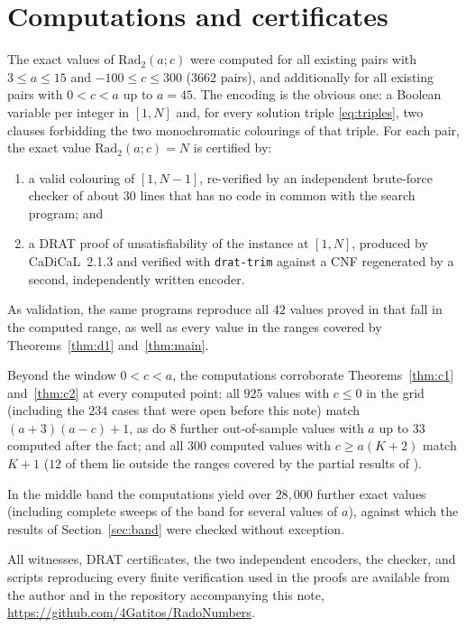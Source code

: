 \documentclass[11pt]{article}
\theoremstyle{remark}
\theoremstyle{definition}
\newcommand{\Rad}{\mathrm{Rad}_2}
\begin{document}
\section{Computations and certificates}\label{sec:comp}

The exact values of $\Rad(a;c)$ were computed for all existing pairs with
$3 \le a \le 15$ and $-100 \le c \le 300$ ($3662$ pairs), and additionally
for all existing pairs with $0 < c < a$ up to $a = 45$. The encoding is the
obvious one: a Boolean variable per integer in $[1,N]$ and, for every
solution triple \eqref{eq:triples}, two clauses forbidding the two
monochromatic colourings of that triple. For each pair, the exact value
$\Rad(a;c) = N$ is certified by:
\begin{enumerate}
\item a valid colouring of $[1, N-1]$, re-verified by an independent
brute-force checker of about $30$ lines that has no code in common with the
search program; and
\item a DRAT proof of unsatisfiability of the instance at $[1,N]$, produced
by CaDiCaL~2.1.3 and verified with \texttt{drat-trim}
\cite{drattrim} against a CNF regenerated by a second, independently written
encoder.
\end{enumerate}
As validation, the same programs reproduce all $42$ values proved in
\cite{DT2020} that fall in the computed range, as well as every value in the
ranges covered by Theorems~\ref{thm:d1} and~\ref{thm:main}.

Beyond the window $0 < c < a$, the computations corroborate
Theorems~\ref{thm:c1} and~\ref{thm:c2} at every computed point:
all $925$ values with $c \le 0$ in the grid (including the $234$ cases that
were open before this note) match $(a+3)(a-c)+1$, as do $8$ further
out-of-sample values with $a$ up to $33$ computed after the fact; and all
$300$ computed values with $c \ge a(K+2)$ match $K+1$ ($12$ of them lie
outside the ranges covered by the partial results of \cite{DT2020}).

In the middle band the computations yield over $28{,}000$ further exact
values (including complete sweeps of the band for several values of $a$),
against which the results of Section~\ref{sec:band} were checked without
exception.

All witnesses, DRAT certificates, the two independent encoders, the checker,
and scripts reproducing every finite verification used in the proofs are
available from the author and in the repository accompanying this note,
\url{https://github.com/4Gatitos/RadoNumbers}.
\end{document}
